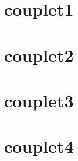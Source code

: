\songbooksongstruct

\newpage

\begin{multicols}{2}
	\songlyrics
\end{multicols}

\newpage

\section*{couplet1}

\section*{couplet2}

\section*{couplet3}

\section*{couplet4}
